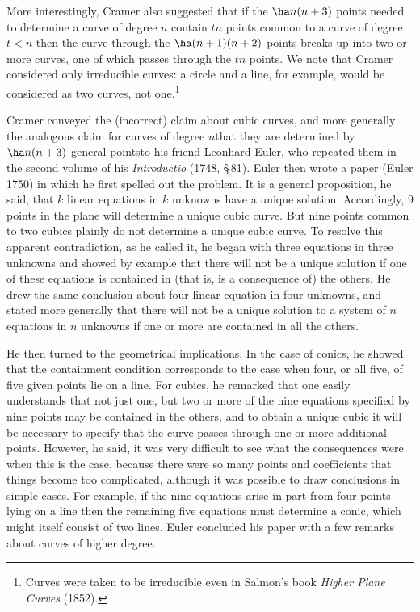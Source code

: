 More interestingly, Cramer also suggested that if the $\ha n(n+3)$ points needed to determine a curve of degree $n$ contain $tn$ points common to a curve of degree $t < n$ then the curve through the  $\ha (n+1)(n+2)$ points breaks up into two or more curves, one of which passes through the $tn$ points. We note that Cramer considered only irreducible curves: a circle and a line, for example, would be considered as two curves, not one.\footnote{Curves were taken to be irreducible even in Salmon's book \emph{Higher Plane Curves} (1852).} 

Cramer conveyed the (incorrect) claim about cubic curves, and more generally the analogous claim for curves of degree $n$\emdash  that they are determined by $\ha n(n+3)$ general points\emdash  to his friend Leonhard Euler, who repeated  them in the second volume of his \emph{Introductio} (1748, \S\,81). Euler then wrote a paper (Euler 1750) in which he first spelled out the problem. It is a general proposition, he said, that $k$ linear equations in $k$ unknowns have a unique solution. Accordingly, 9 points in the plane will determine a unique cubic curve. But nine points common to two cubics plainly do not determine a unique cubic curve. To resolve this apparent contradiction, as he called it, he began with  three equations in three unknowns and showed by example that there will not be a unique solution if one of these equations is contained in (that is, is a consequence of) the others. He drew the same conclusion about four linear equation in four unknowns, and stated more generally that there will not be a unique solution to a system of $n$ equations in $n$ unknowns if one or more are contained in all the others. 

He then turned to the geometrical implications. In the case of conics, he showed that the containment condition corresponds to the case when four, or all five, of five given points lie on a line.  For cubics, he remarked that one easily understands that not just one, but two or more of the nine equations specified by nine points may be contained in the others, and to obtain a unique cubic it will be necessary to specify that the curve passes through one or more additional points.  However, he said, it was very difficult to see what the consequences were when this is the case, because there were so many points and coefficients that things become too complicated, although it was possible to draw conclusions in simple cases. For example, if the nine equations arise in part from four points lying on a line then the remaining five equations must determine a conic, which might itself consist of two lines. Euler concluded his paper with a few remarks about curves of higher degree.


